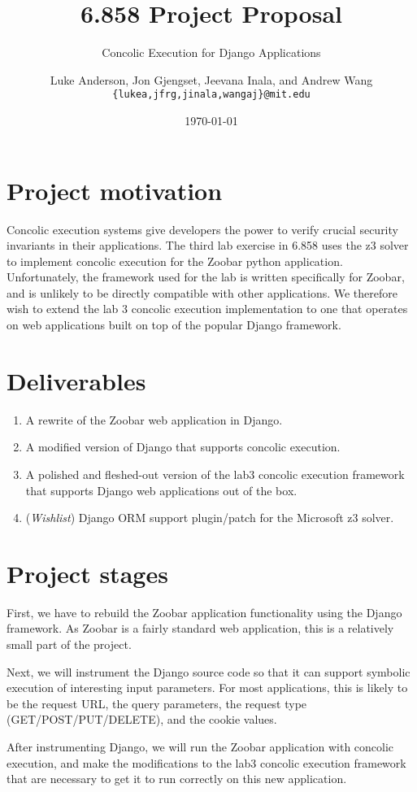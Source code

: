 \documentclass{scrartcl}
\author{Luke Anderson, Jon Gjengset, Jeevana Inala, and Andrew Wang \\
	\texttt{\{lukea,jfrg,jinala,wangaj\}@mit.edu}
}
\title{6.858 Project Proposal}
\subtitle{Concolic Execution for Django Applications}
\date{\today}
\begin{document}
\maketitle

\section{Project motivation}
Concolic execution systems give developers the power to verify crucial security
invariants in their applications. The third lab exercise in 6.858 uses the z3 solver to implement concolic
execution for the Zoobar python application. Unfortunately, the framework used
for the lab is written specifically for Zoobar, and is unlikely to be directly
compatible with other applications. We therefore wish to extend the lab
3 concolic execution implementation to one that operates on web applications
built on top of the popular Django framework.

\section{Deliverables}
\begin{enumerate}
	\item A rewrite of the Zoobar web application in Django.
	\item A modified version of Django that supports concolic execution.
	\item A polished and fleshed-out version of the lab3 concolic execution
		framework that supports Django web applications out of the box.
	\item (\textit{Wishlist}) Django ORM support plugin/patch for the
		Microsoft z3 solver.
\end{enumerate}

\section{Project stages}
First, we have to rebuild the Zoobar application functionality using the Django
framework. As Zoobar is a fairly standard web application, this is a relatively
small part of the project.

Next, we will instrument the Django source code so that it can support symbolic
execution of interesting input parameters. For most applications, this is
likely to be the request URL, the query parameters, the request type
(GET/POST/PUT/DELETE), and the cookie values.

After instrumenting Django, we will run the Zoobar application with concolic
execution, and make the modifications to the lab3 concolic execution framework
that are necessary to get it to run correctly on this new application.
\end{document}
